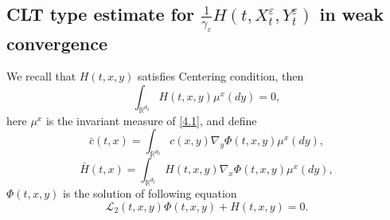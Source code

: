 \documentclass[11pt,reqno]{amsart}
\numberwithin{equation}{section}
\begin{document}
\subsection{CLT type estimate for $\frac{1}{\gamma_{\varepsilon}}H(t,X_{t}^{\varepsilon},Y_{t}^{\varepsilon})$  in weak convergence}


We recall that  $ H(t,x,y)$ satisfies Centering condition, then  $$\int_{\mathbb{R}^{ d_{2}}}H(t,x,y)\mu^{x}(dy)=0,$$
here $\mu^{x}$ is the invariant measure of \eqref{4.1}, and define
\begin{equation}
	\bar{c}(t,x)=\int_{\mathbb{R}^{ d_{2}}}c(x,y)\nabla_{y}\Phi(t,x,y)\mu^{x}(dy),
	\nonumber
\end{equation}
\begin{equation}
	\bar{H}(t,x)=\int_{\mathbb{R}^{ d_{2}}}H(t,x,y)\nabla_{x}\Phi(t,x,y)\mu^{x}(dy),
	\nonumber
\end{equation}
$\Phi(t,x,y)$ is the solution of following equation
\begin{equation}\label{6.36-1}
	\mathcal{L}_{2}(t,x,y)\Phi(t,x,y)+H(t,x,y)=0.
	\end{equation}
\end{document}
